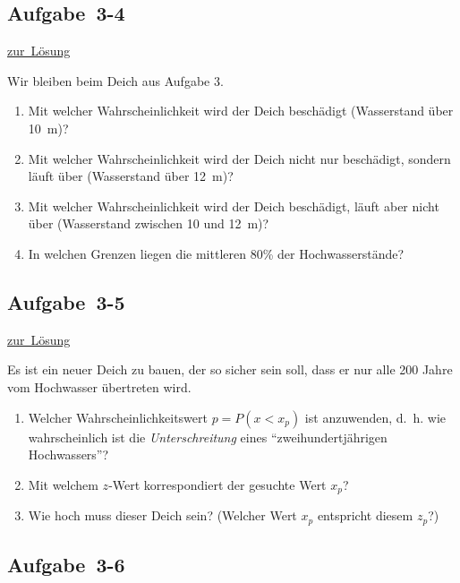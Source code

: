 \documentclass[
  11pt,
  ngerman,
  a4paper,
]{report}
\providecommand{\tightlist}{%
  \setlength{\itemsep}{0pt}\setlength{\parskip}{0pt}}
\begin{document}
\hypertarget{aufgabe-3-4}{%
\subsection{Aufgabe~3-4}\label{aufgabe-3-4}}

\protect\hyperlink{loesung-3-4}{zur~Lösung}

Wir bleiben beim Deich aus Aufgabe 3.

\begin{enumerate}
\def\labelenumi{\alph{enumi})}
\tightlist
\item
  Mit welcher Wahrscheinlichkeit wird der Deich beschädigt (Wasserstand über 10~m)?
\item
  Mit welcher Wahrscheinlichkeit wird der Deich nicht nur beschädigt, sondern läuft über (Wasserstand über 12~m)?
\item
  Mit welcher Wahrscheinlichkeit wird der Deich beschädigt, läuft aber nicht über (Wasserstand zwischen 10 und 12~m)?
\item
  In welchen Grenzen liegen die mittleren 80\% der Hochwasserstände?
\end{enumerate}

\hypertarget{aufgabe-3-5}{%
\subsection{Aufgabe~3-5}\label{aufgabe-3-5}}

\protect\hyperlink{loesung-3-5}{zur~Lösung}

Es ist ein neuer Deich zu bauen, der so sicher sein soll, dass er nur alle 200 Jahre vom Hochwasser übertreten wird.

\begin{enumerate}
\def\labelenumi{\alph{enumi})}
\tightlist
\item
  Welcher Wahrscheinlichkeitswert \(p=P(x < x_p)\) ist anzuwenden, d.~h. wie wahrscheinlich ist die \emph{Unterschreitung} eines \enquote{zweihundertjährigen Hochwassers}?
\item
  Mit welchem \(z\)-Wert korrespondiert der gesuchte Wert \(x_p\)?
\item
  Wie hoch muss dieser Deich sein? (Welcher Wert \(x_p\) entspricht diesem \(z_p\)?)
\end{enumerate}

\hypertarget{aufgabe-3-6}{%
\subsection{Aufgabe~3-6}\label{aufgabe-3-6}}
\end{document}
